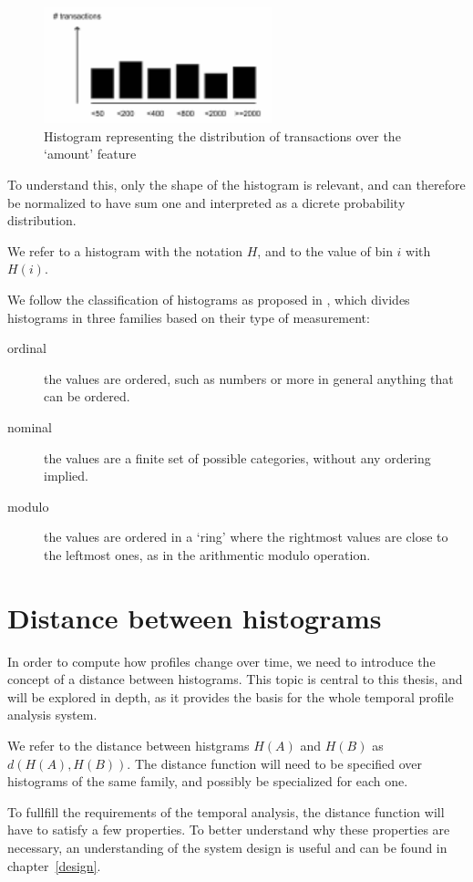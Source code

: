 \begin{figure}[h]
\centering
\includegraphics[width=250]{images/flat_histogram.pdf}
\caption{Histogram representing the distribution of transactions over the `amount' feature}
\label{fig:flat_histogram}
\end{figure}

To understand this, only the shape of the histogram is relevant, and can therefore be normalized to have sum one and interpreted as a dicrete probability distribution.

We refer to a histogram with the notation $H$, and to the value of bin $i$ with $H(i)$.

We follow the classification of histograms as proposed in \cite{histogram}, which divides histograms in three families based on their type of measurement:

\begin{description}
\item[ordinal] the values are ordered, such as numbers or more in general anything that can be ordered.
\item[nominal] the values are a finite set of possible categories, without any ordering implied.
\item[modulo] the values are ordered in a `ring' where the rightmost values are close to the leftmost ones, as in the arithmentic modulo operation.
\end{description}

\section{Distance between histograms}

In order to compute how profiles change over time, we need to introduce the concept of a distance between histograms. This topic is central to this thesis, and will be explored in depth, as it provides the basis for the whole temporal profile analysis system.

We refer to the distance between histgrams $H(A)$ and $H(B)$ as $d(H(A), H(B))$.
The distance function will need to be specified over histograms of the same family, and possibly be specialized for each one.

To fullfill the requirements of the temporal analysis, the distance function will have to satisfy a few properties. To better understand why these properties are necessary, an understanding of the system design is useful and can be found in chapter~\ref{design}.

